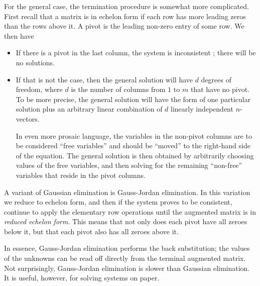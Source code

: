 \documentclass[12pt]{article}
\begin{document}
For the general case, the termination procedure is somewhat more
complicated. First recall that a matrix is in echelon form if each
row has more leading zeros than the rows above it. A pivot is the
leading non-zero entry of some row. We then have
\begin{itemize}
\item If there is a pivot in the last column, the system is
inconsistent ; there will be no solutions.
\item If that is not the case, then the general solution will have $d$
degrees of freedom, where $d$ is the number of columns from $1$ to
$m$ that have no pivot. To be more precise, the general solution
will have the form of one particular solution plus an arbitrary linear
combination of $d$ linearly independent $n$-vectors.

In even more prosaic language, the variables in the non-pivot
columns are to be considered ``free variables'' and should be
``moved'' to the right-hand side of the equation. The general
solution is then obtained by arbitrarily choosing values of the free
variables, and then solving for the remaining ``non-free'' variables
that reside in the pivot columns.
\end{itemize}

A variant of Gaussian elimination is Gauss-Jordan elimination. In
this variation we reduce to echelon form, and then if the system
proves to be consistent, continue to apply the elementary row
operations until the augmented matrix is in {\em reduced echelon
form}. This means that not only does each pivot have all zeroes
below it, but that each pivot also has all zeroes above it.

In essence, Gauss-Jordan elimination performs the back substitution;
the values of the unknowns can be read off directly from the terminal
augmented matrix. Not surprisingly, Gauss-Jordan elimination is
slower than Gaussian elimination. It is useful, however, for solving
systems on paper.
\end{document}
